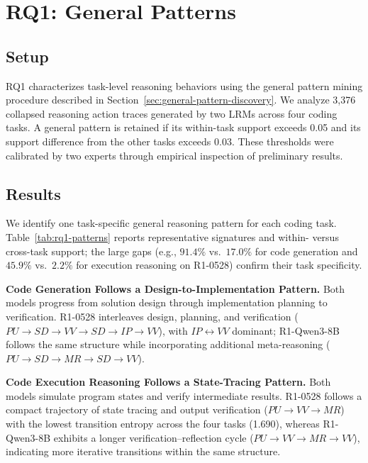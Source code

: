\documentclass[acmsmall,screen,review,anonymous]{acmart}
\begin{document}
\section{RQ1: General Patterns}
\label{sec:rq1}

\subsection{Setup}
RQ1 characterizes task-level reasoning behaviors using the general pattern mining procedure described in Section~\ref{sec:general-pattern-discovery}. We analyze 3{,}376 collapsed reasoning action traces generated by two LRMs across four coding tasks. A general pattern is retained if its within-task support exceeds 0.05 and its support difference from the other tasks exceeds 0.03. These thresholds were calibrated by two experts through empirical inspection of preliminary results.

\subsection{Results}

We identify one task-specific general reasoning pattern for each coding task. Table~\ref{tab:rq1-patterns} reports representative signatures and within- versus cross-task support; the large gaps (e.g., $91.4\%$ vs.\ $17.0\%$ for code generation and $45.9\%$ vs.\ $2.2\%$ for execution reasoning on R1-0528) confirm their task specificity.



\textbf{Code Generation Follows a Design-to-Implementation Pattern.}
Both models progress from solution design through implementation planning to verification. R1-0528 interleaves design, planning, and verification (\(PU\rightarrow SD\rightarrow VV\rightarrow SD\rightarrow IP\rightarrow VV\)), with \(IP\leftrightarrow VV\) dominant; R1-Qwen3-8B follows the same structure while incorporating additional meta-reasoning (\(PU\rightarrow SD\rightarrow MR\rightarrow SD\rightarrow VV\)).

\textbf{Code Execution Reasoning Follows a State-Tracing Pattern.}
Both models simulate program states and verify intermediate results. R1-0528 follows a compact trajectory of state tracing and output verification (\(PU\rightarrow VV\rightarrow MR\)) with the lowest transition entropy across the four tasks (1.690), whereas R1-Qwen3-8B exhibits a longer verification--reflection cycle (\(PU\rightarrow VV\rightarrow MR\rightarrow VV\)), indicating more iterative transitions within the same structure.
\end{document}
